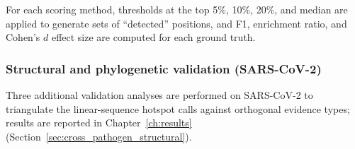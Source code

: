 \begin{table}[htbp]
\centering
\caption{Stage~1 temporal scoring variants used only for SARS-CoV-2 analysis}
\label{tab:alternative_scoring}
\small
{}
\end{table}

\noindent For each scoring method, thresholds at the top 5\%, 10\%, 20\%, and median are applied to generate sets of ``detected'' positions, and F1, enrichment ratio, and Cohen's $d$ effect size are computed for each ground truth.

\subsubsection{Structural and phylogenetic validation (SARS-CoV-2)}
\label{subsubsec:structural_phylo_validation}

Three additional validation analyses are performed on SARS-CoV-2 to triangulate the linear-sequence hotspot calls against orthogonal evidence types; results are reported in Chapter~\ref{ch:results} (Section~\ref{sec:cross_pathogen_structural}).

